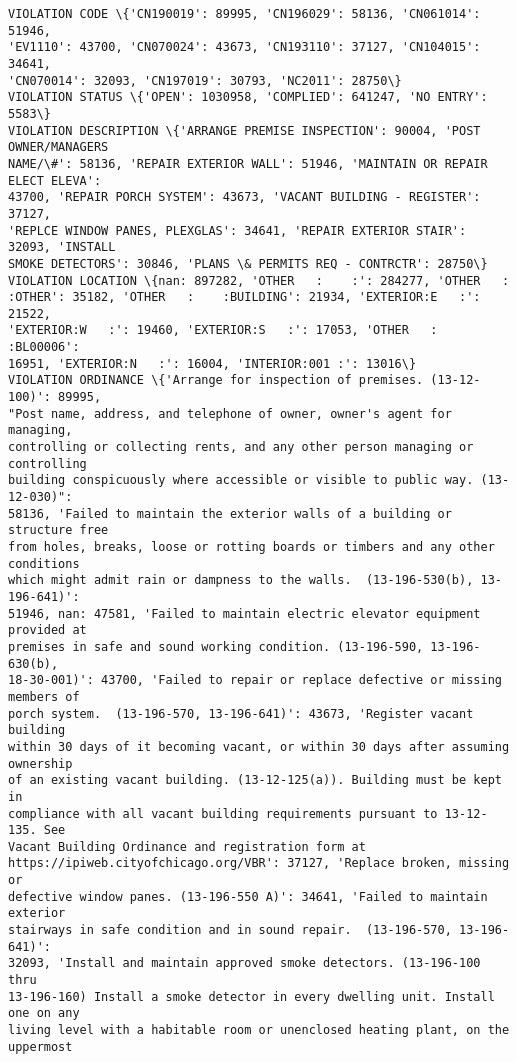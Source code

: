 \documentclass[11pt]{article}
\begin{document}
    \begin{Verbatim}[commandchars=\\\{\}]
VIOLATION CODE \{'CN190019': 89995, 'CN196029': 58136, 'CN061014': 51946,
'EV1110': 43700, 'CN070024': 43673, 'CN193110': 37127, 'CN104015': 34641,
'CN070014': 32093, 'CN197019': 30793, 'NC2011': 28750\}
VIOLATION STATUS \{'OPEN': 1030958, 'COMPLIED': 641247, 'NO ENTRY': 5583\}
VIOLATION DESCRIPTION \{'ARRANGE PREMISE INSPECTION': 90004, 'POST OWNER/MANAGERS
NAME/\#': 58136, 'REPAIR EXTERIOR WALL': 51946, 'MAINTAIN OR REPAIR ELECT ELEVA':
43700, 'REPAIR PORCH SYSTEM': 43673, 'VACANT BUILDING - REGISTER': 37127,
'REPLCE WINDOW PANES, PLEXGLAS': 34641, 'REPAIR EXTERIOR STAIR': 32093, 'INSTALL
SMOKE DETECTORS': 30846, 'PLANS \& PERMITS REQ - CONTRCTR': 28750\}
VIOLATION LOCATION \{nan: 897282, 'OTHER   :    :': 284277, 'OTHER   :
:OTHER': 35182, 'OTHER   :    :BUILDING': 21934, 'EXTERIOR:E   :': 21522,
'EXTERIOR:W   :': 19460, 'EXTERIOR:S   :': 17053, 'OTHER   :    :BL00006':
16951, 'EXTERIOR:N   :': 16004, 'INTERIOR:001 :': 13016\}
VIOLATION ORDINANCE \{'Arrange for inspection of premises. (13-12-100)': 89995,
"Post name, address, and telephone of owner, owner's agent for managing,
controlling or collecting rents, and any other person managing or controlling
building conspicuously where accessible or visible to public way. (13-12-030)":
58136, 'Failed to maintain the exterior walls of a building or structure free
from holes, breaks, loose or rotting boards or timbers and any other conditions
which might admit rain or dampness to the walls.  (13-196-530(b), 13-196-641)':
51946, nan: 47581, 'Failed to maintain electric elevator equipment provided at
premises in safe and sound working condition. (13-196-590, 13-196-630(b),
18-30-001)': 43700, 'Failed to repair or replace defective or missing members of
porch system.  (13-196-570, 13-196-641)': 43673, 'Register vacant building
within 30 days of it becoming vacant, or within 30 days after assuming ownership
of an existing vacant building. (13-12-125(a)). Building must be kept in
compliance with all vacant building requirements pursuant to 13-12-135. See
Vacant Building Ordinance and registration form at
https://ipiweb.cityofchicago.org/VBR': 37127, 'Replace broken, missing or
defective window panes. (13-196-550 A)': 34641, 'Failed to maintain exterior
stairways in safe condition and in sound repair.  (13-196-570, 13-196-641)':
32093, 'Install and maintain approved smoke detectors. (13-196-100 thru
13-196-160) Install a smoke detector in every dwelling unit. Install one on any
living level with a habitable room or unenclosed heating plant, on the uppermost

\end{Verbatim}
\end{document}
